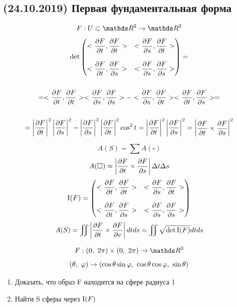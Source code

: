 \documentclass[12pt, fleqn]{article}
\begin{document}
\subsection{(24.10.2019) Первая фундаментальная форма}
\begin{Example}
  \[F: U \subset \R^2 \ra \R^3\]
  \begin{multline*}
    $$\det \begin{pmatrix}
      <\dfrac{\d F}{\d t}, \dfrac{\d F}{\d t}> & <\dfrac{\d F}{\d s}, \dfrac{\d F}{\d t}>\\
      \\
      <\dfrac{\d F}{\d t}, \dfrac{\d F}{\d s}> & <\dfrac{\d F}{\d s}, \dfrac{\d F}{\d s}>
    \end{pmatrix} = \\ \\
      = <\frac{\d F}{\d t}, \frac{\d F}{\d t}> <\frac{\d F}{\d s}, \frac{\d F}{\d s}> - <\frac{\d F}{\d s}, \frac{\d F}{\d t}> <\frac{\d F}{\d t}, \dfrac{\d F}{\d s}> =\\ \\
     =\abs{\dfrac{\d F}{\d t}}^2 \abs{\dfrac{\d F}{\d s}}^2 - \abs{\dfrac{\d F}{\d s}}^2 \abs{\dfrac{\d F}{\d t}}^2 \cos^2 t = \abs{\dfrac{\d F}{\d t}}^2 \abs{\dfrac{\d F}{\d s}}^2
    =
    \begin{vmatrix}
      \dfrac{\d F}{\d t} \times \dfrac{\d F}{\d s}
    \end{vmatrix}^2$$
  \end{multline*}
\end{Example}

\begin{Remark}
  \[A(S)=\sum A(\square)\]
  \[A(\square) \approx \left|\dfrac{\partial F}{\partial t} \times \dfrac{\partial F}{\partial s}\right| \Delta t \Delta s\]
  \[\RNumb{1}(F)= \begin{pmatrix}
    <\dfrac{\d F}{\d t}, \dfrac{\d F}{\d t}> & <\dfrac{\d F}{\d s}, \dfrac{\d F}{\d t}>\\
    \\
    <\dfrac{\d F}{\d t}, \dfrac{\d F}{\d s}> & <\dfrac{\d F}{\d s}, \dfrac{\d F}{\d s}>
  \end{pmatrix}\]
  \[A(S)= \iint \abs{\dfrac{\d F}{\d t} \times \dfrac{\d F}{\d v}} dt ds = \iint \sqrt{\det \RNumb{1}(F)} dt ds\]
\end{Remark}

\begin{Example}
  \[F: (0,\ 2\pi) \times (0,\ 2\pi) \ra \R^3\]
  \[(\theta,\ \varphi) \rightarrow (\cos \theta \sin \varphi,\ \cos \theta \cos \varphi,\ \sin \theta)\]
  \begin{enumerate}
    \item Доказать, что образ F находится на сфере радиуса 1
    \item Найти S сферы через $\RNumb{1}(F)$
  \end{enumerate}
\end{Example}
\end{document}
